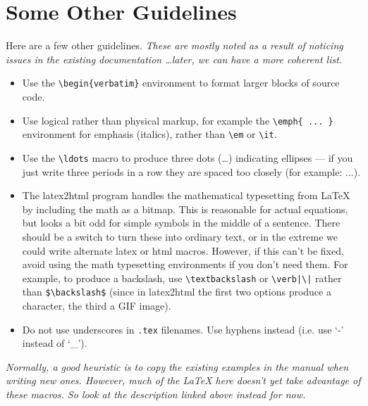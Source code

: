 \section{Some Other Guidelines}

Here are a few other guidelines.  \emph{These are mostly noted as a result
  of noticing issues in the existing documentation \ldots later, we can
  have a more coherent list.}

\begin{itemize}

\item Use the \verb|\begin{verbatim}| environment to format larger blocks of
source code.

\item Use logical rather than physical markup, for example the
\verb|\emph{ ... }| environment for emphasis (italics), rather than
\verb|\em| or \verb|\it|.

\item Use the \verb|\ldots| macro to produce three dots (\ldots) indicating
  ellipses --- if you just write three periods in a row they are spaced too
  closely (for example: ...).

\item The latex2html \latexindex program handles the mathematical typesetting from
  \LaTeX{} \latexindex by including the math as a bitmap.  This is reasonable for
  actual equations, but looks a bit odd for simple symbols in the middle of
  a sentence.  There should be a switch to turn these into ordinary text,
  or in the extreme we could write alternate latex \latexindex or html macros.
  However, if this can't be fixed, avoid using the math typesetting
  environments if you don't need them.  For example, to produce a
  backslash, use \verb|\textbackslash| or \verb$\verb|\|$ rather than
  \verb|$\backslash$| (since in latex2html \latexindex the first two options produce a
  character, the third a GIF image).

\item Do not use underscores in \verb|.tex| filenames. Use hyphens instead (i.e. use `-' instead of `_').

\end{itemize}


\emph{Normally, a good heuristic is to copy the existing examples in the
  manual when writing new ones.  However, much of the \LaTeX{} here doesn't yet
  take advantage of these macros.  So look at the description linked above
  instead for now.}

